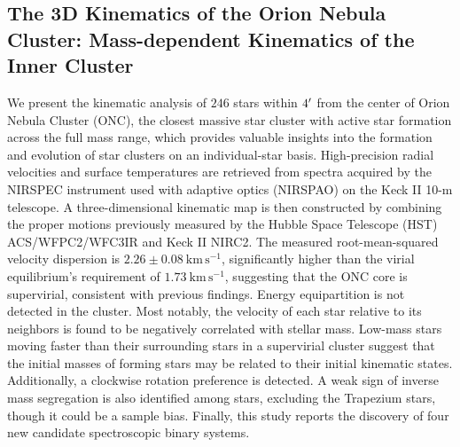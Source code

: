 \documentclass[12pt]{ucsddissertation}
\begin{document}
\begin{CJK*}{UTF8}{gbsn}
\newpage

\chapter{The 3D Kinematics of the Orion Nebula Cluster: Mass-dependent Kinematics of the Inner Cluster}
\label{chapter:onc}
We present the kinematic analysis of $246$ stars within $4\mbox{$^\prime$}$ from the center of Orion Nebula Cluster (ONC), the closest massive star cluster with active star formation across the full mass range, which provides valuable insights into the formation and evolution of star clusters on an individual-star basis. High-precision radial velocities and surface temperatures are retrieved from spectra acquired by the NIRSPEC instrument used with adaptive optics (NIRSPAO) on the Keck II 10-m telescope. A three-dimensional kinematic map is then constructed by combining the proper motions previously measured by the Hubble Space Telescope (HST) ACS/WFPC2/WFC3IR and Keck II NIRC2. The measured root-mean-squared velocity dispersion is $2.26\pm0.08~\mathrm{km}\,\mathrm{s}^{-1}$, significantly higher than the virial equilibrium's requirement of $1.73~\mathrm{km}\,\mathrm{s}^{-1}$, suggesting that the ONC core is supervirial, consistent with previous findings. Energy equipartition is not detected in the cluster. Most notably, the velocity of each star relative to its neighbors is found to be negatively correlated with stellar mass.  Low-mass stars moving faster than their surrounding stars in a supervirial cluster suggest that the initial masses of forming stars may be related to their initial kinematic states. Additionally, a clockwise rotation preference is detected. A weak sign of inverse mass segregation is also identified among stars, excluding the Trapezium stars, though it could be a sample bias. Finally, this study reports the discovery of four new candidate spectroscopic binary systems.


\end{CJK*}
\end{document}
